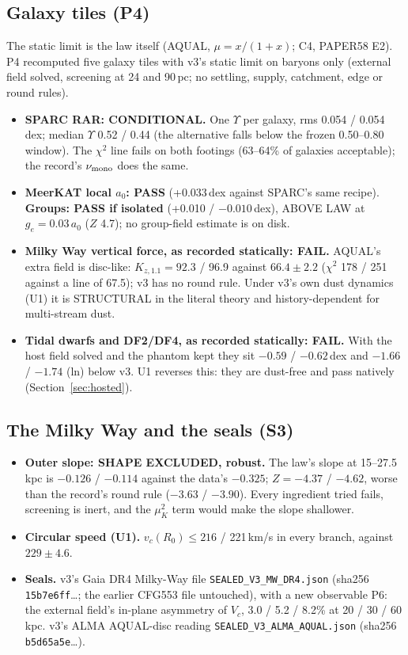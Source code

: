 \documentclass[10pt]{article}
\begin{document}
\subsection{Galaxy tiles (P4)}
The static limit is the law itself (AQUAL, $\mu=x/(1+x)$; C4, PAPER58 E2). P4 recomputed five galaxy tiles with v3's static limit on baryons only (external field solved, screening at 24 and 90\,pc; no settling, supply, catchment, edge or round rules).
\begin{itemize}
\item \textbf{SPARC RAR: CONDITIONAL.} One $\Upsilon$ per galaxy, rms 0.054 / 0.054\,dex; median $\Upsilon$ 0.52 / 0.44 (the alternative falls below the frozen 0.50--0.80 window). The $\chi^2$ line fails on both footings (63--64\% of galaxies acceptable); the record's $\nu_{\rm mono}$ does the same.
\item \textbf{MeerKAT local $a_0$: PASS} (+0.033\,dex against SPARC's same recipe). \textbf{Groups: PASS if isolated} (+0.010 / $-0.010$\,dex), ABOVE LAW at $g_e=0.03\,a_0$ ($Z$ 4.7); no group-field estimate is on disk.
\item \textbf{Milky Way vertical force, as recorded statically: FAIL.} AQUAL's extra field is disc-like: $K_{z,1.1}=92.3$ / 96.9 against $66.4\pm2.2$ ($\chi^2$ 178 / 251 against a line of 67.5); v3 has no round rule. Under v3's own dust dynamics (U1) it is STRUCTURAL in the literal theory and history-dependent for multi-stream dust.
\item \textbf{Tidal dwarfs and DF2/DF4, as recorded statically: FAIL.} With the host field solved and the phantom kept they sit $-0.59$ / $-0.62$\,dex and $-1.66$ / $-1.74$ (ln) below v3. U1 reverses this: they are dust-free and pass natively (Section~\ref{sec:hosted}).
\end{itemize}

\subsection{The Milky Way and the seals (S3)}
\begin{itemize}
\item \textbf{Outer slope: SHAPE EXCLUDED, robust.} The law's slope at 15--27.5\,kpc is $-0.126$ / $-0.114$ against the data's $-0.325$; $Z=-4.37$ / $-4.62$, worse than the record's round rule ($-3.63$ / $-3.90$). Every ingredient tried fails, screening is inert, and the $\mu_K^2$ term would make the slope shallower.
\item \textbf{Circular speed (U1).} $v_c(R_0)\le216$ / 221\,km/s in every branch, against $229\pm4.6$.
\item \textbf{Seals.} v3's Gaia DR4 Milky-Way file \texttt{SEALED\_V3\_MW\_DR4.json} (sha256 \texttt{15b7e6ff}\dots; the earlier CFG553 file untouched), with a new observable P6: the external field's in-plane asymmetry of $V_c$, 3.0 / 5.2 / 8.2\% at 20 / 30 / 60\,kpc. v3's ALMA AQUAL-disc reading \texttt{SEALED\_V3\_ALMA\_AQUAL.json} (sha256 \texttt{b5d65a5e}\dots).
\end{itemize}
\end{document}
